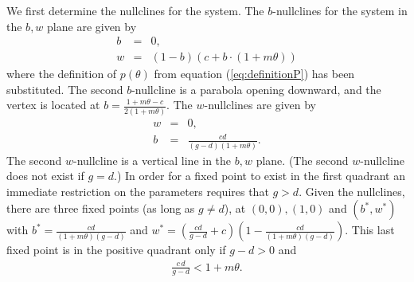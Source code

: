 \documentclass[review,authoryear]{elsarticle}
\begin{document}
We first determine the nullclines for the system.
The $b$-nullclines for the system in the $b,w$ plane are given by
\begin{eqnarray}
  \label{eq:bnullclines}
  b & = & 0, \\
  w & = & (1-b)(c+b\cdot(1+m\theta))
\end{eqnarray}
where the definition of $p(\theta)$ from equation (\ref{eq:definitionP}) has been substituted.
The second $b$-nullcline is a parabola opening downward, and the vertex is located at
$b=\frac{1+m\theta-c}{2(1+m\theta)}$. The $w$-nullclines are given by
\begin{eqnarray}
  \label{eq:wnullclines}
  w & = & 0, \\
  b & = & \frac{cd}{(g-d)(1+m\theta)}.
\end{eqnarray}
The second $w$-nullcline is a vertical line in the $b,w$ plane. (The second $w$-nullcline does not exist if $g=d$.) In
order for a fixed point to exist in the first quadrant an immediate
restriction on the parameters requires that $g>d$.  Given the
nullclines, there are three fixed points (as long as $g\ne d$), at $(0,0), (1,0)$ and $(b^*,w^*)$ with $b^*=\frac{cd}{(1+m\theta)(g-d)}$ and
$w^*=\left(\frac{cd}{g-d}+c\right)\left(1-\frac{cd}{(1+m\theta)(g-d)}\right)$.  This last fixed point is in the positive quadrant only if $g-d>0$ and
\begin{eqnarray}
\label{eqn:positivityRequirement}
\frac{c\,d}{g-d}<1+m\theta.
\end{eqnarray}
\end{document}
